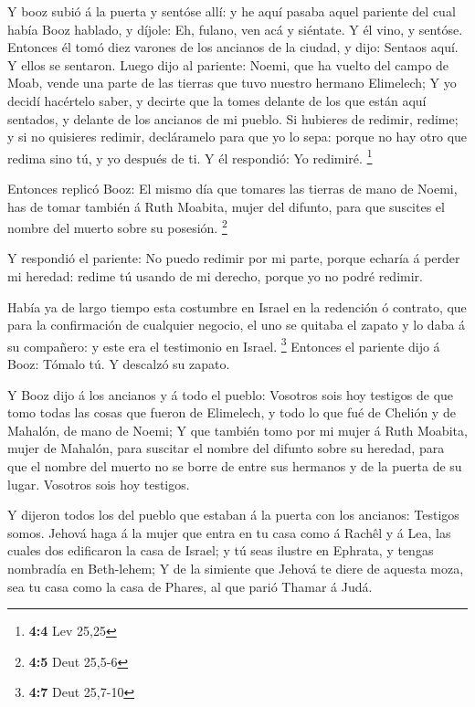  Y booz subió á la puerta y sentóse allí: y he aquí pasaba
aquel pariente del cual había Booz hablado, y díjole: Eh, fulano, ven
acá y siéntate. Y él vino, y sentóse.  Entonces él tomó diez
varones de los ancianos de la ciudad, y dijo: Sentaos aquí. Y ellos se
sentaron.  Luego dijo al pariente: Noemi, que ha vuelto del
campo de Moab, vende una parte de las tierras que tuvo nuestro hermano
Elimelech;  Y yo decidí hacértelo saber, y decirte que la
tomes delante de los que están aquí sentados, y delante de los ancianos
de mi pueblo. Si hubieres de redimir, redime; y si no quisieres redimir,
decláramelo para que yo lo sepa: porque no hay otro que redima sino tú,
y yo después de ti. Y él respondió: Yo redimiré. \footnote{\textbf{4:4}
  Lev 25,25}

 Entonces replicó Booz: El mismo día que tomares las tierras
de mano de Noemi, has de tomar también á Ruth Moabita, mujer del
difunto, para que suscites el nombre del muerto sobre su posesión.
\footnote{\textbf{4:5} Deut 25,5-6}

 Y respondió el pariente: No puedo redimir por mi parte,
porque echaría á perder mi heredad: redime tú usando de mi derecho,
porque yo no podré redimir.

 Había ya de largo tiempo esta costumbre en Israel en la
redención ó contrato, que para la confirmación de cualquier negocio, el
uno se quitaba el zapato y lo daba á su compañero: y este era el
testimonio en Israel. \footnote{\textbf{4:7} Deut 25,7-10} 
Entonces el pariente dijo á Booz: Tómalo tú. Y descalzó su zapato.

 Y Booz dijo á los ancianos y á todo el pueblo: Vosotros
sois hoy testigos de que tomo todas las cosas que fueron de Elimelech, y
todo lo que fué de Chelión y de Mahalón, de mano de Noemi; 
Y que también tomo por mi mujer á Ruth Moabita, mujer de Mahalón, para
suscitar el nombre del difunto sobre su heredad, para que el nombre del
muerto no se borre de entre sus hermanos y de la puerta de su lugar.
Vosotros sois hoy testigos.

 Y dijeron todos los del pueblo que estaban á la puerta con
los ancianos: Testigos somos. Jehová haga á la mujer que entra en tu
casa como á Rachêl y á Lea, las cuales dos edificaron la casa de Israel;
y tú seas ilustre en Ephrata, y tengas nombradía en Beth-lehem;
 Y de la simiente que Jehová te diere de aquesta moza, sea
tu casa como la casa de Phares, al que parió Thamar á Judá.

